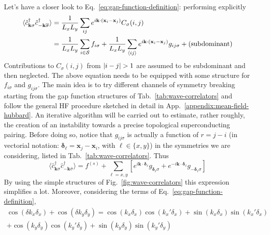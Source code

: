 Let's have a closer look to Eq.~\eqref{eq:gap-function-definition}: performing explicitly
\[
\begin{aligned}
	\langle 
		\hat c_{\mathbf{k}\sigma}^\dagger \hat c_{-\mathbf{k} \overline{\sigma}}^\dagger
	\rangle &= \frac{1}{L_x L_y} \sum_{ij} e^{i \mathbf{k} \cdot (\mathbf{x}_i - \mathbf{x}_j)} C_\sigma(i,j) \\
	&= \frac{1}{L_x L_y} \sum_{i \in \mathcal{S}} f_{i\sigma} + \frac{1}{L_x L_y} \sum_{\ev{ij}} e^{i \mathbf{k} \cdot (\mathbf{x}_i - \mathbf{x}_j)} g_{ij\sigma} + (\text{subdominant})
\end{aligned}
\]
Contributions to $C_\sigma(i,j)$ from $\abs{i-j}>1$ are assumed to be subdominant and then neglected. The above equation needs to be equipped with some structure for $f_{i\sigma}$ and $g_{ij\sigma}$. The main idea is to try different channels of symmetry breaking starting from the gap function structures of Tab.~\ref{tab:wave-correlators} and follow the general HF procedure sketched in detail in App.~\ref{appendix:mean-field-hubbard}. An iterative algorithm will be carried out to estimate, rather roughly, the creation of an instability towards a precise topological superconducting pairing. Before doing so, notice that $g_{ij\sigma}$ is actually a function of $r = j-i$ (in vectorial notation: $\bm{\delta}_\ell = \mathbf{x}_j - \mathbf{x}_i$, with $\ell \in \lbrace x,y \rbrace$) in the symmetries we are considering, listed in Tab.~\ref{tab:wave-correlators}. Thus
\begin{equation}\label{eq:correlation-fourier}
	\langle 
		\hat c_{\mathbf{k}\sigma}^\dagger \hat c_{-\mathbf{k} \overline{\sigma}}^\dagger
	\rangle = f^{(s)} + \sum_{\ell = x,y} \left[
		e^{i \mathbf{k} \cdot \bm{\delta_\ell}} g_{\bm{\delta}_\ell\sigma} + e^{- i \mathbf{k} \cdot \bm{\delta_\ell}} g_{-\bm{\delta}_\ell\sigma}
	\right]
\end{equation}
By using the simple structures of Fig.~\ref{fig:wave-correlators} this expression simplifies a lot. Moreover, considering the terms of Eq.~\eqref{eq:gap-function-definition},
\begin{multline*}
	\cos \left( \delta k_x \delta_x \right)	+ \cos \left( \delta k_y \delta_y \right) = \cos \left( k_x \delta_x \right) \cos \left( k_x' \delta_x \right) + \sin \left( k_x \delta_x \right) \sin \left( k_x' \delta_x \right) \\ 
	+ \cos \left( k_y \delta_y \right) \cos \left( k_y' \delta_y \right) + \sin \left( k_y \delta_y \right) \sin \left( k_y' \delta_y \right)
\end{multline*}
